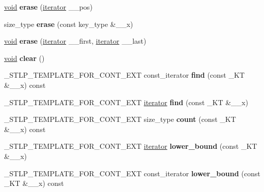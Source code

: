 \begin{DoxyCompactItemize}
\hyperlink{interfacevoid}{void} {\bfseries erase} (\hyperlink{structiterator}{iterator} \+\_\+\+\_\+pos)
\item 
\mbox{\label{classset_af22549a1c71d4ff2799a80de1c2550c2}} 
size\+\_\+type {\bfseries erase} (const key\+\_\+type \&\+\_\+\+\_\+x)
\item 
\mbox{\label{classset_a0eb060827564738597193ab7409b8a5d}} 
\hyperlink{interfacevoid}{void} {\bfseries erase} (\hyperlink{structiterator}{iterator} \+\_\+\+\_\+first, \hyperlink{structiterator}{iterator} \+\_\+\+\_\+last)
\item 
\mbox{\label{classset_aac453bed9a1533ae8b61b742715cd9b6}} 
\hyperlink{interfacevoid}{void} {\bfseries clear} ()
\item 
\mbox{\label{classset_af0da5cfd76294579571b69f02d34a4c8}} 
\+\_\+\+S\+T\+L\+P\+\_\+\+T\+E\+M\+P\+L\+A\+T\+E\+\_\+\+F\+O\+R\+\_\+\+C\+O\+N\+T\+\_\+\+E\+XT const\+\_\+iterator {\bfseries find} (const \+\_\+\+KT \&\+\_\+\+\_\+x) const
\item 
\mbox{\label{classset_ad3a014a4f6c8e4e1a434a4154601ef38}} 
\+\_\+\+S\+T\+L\+P\+\_\+\+T\+E\+M\+P\+L\+A\+T\+E\+\_\+\+F\+O\+R\+\_\+\+C\+O\+N\+T\+\_\+\+E\+XT \hyperlink{structiterator}{iterator} {\bfseries find} (const \+\_\+\+KT \&\+\_\+\+\_\+x)
\item 
\mbox{\label{classset_ad9e90e165a8c79914bada7b0bdd7d2d1}} 
\+\_\+\+S\+T\+L\+P\+\_\+\+T\+E\+M\+P\+L\+A\+T\+E\+\_\+\+F\+O\+R\+\_\+\+C\+O\+N\+T\+\_\+\+E\+XT size\+\_\+type {\bfseries count} (const \+\_\+\+KT \&\+\_\+\+\_\+x) const
\item 
\mbox{\label{classset_ad76fd2219200a0fecd43ffdd736cec47}} 
\+\_\+\+S\+T\+L\+P\+\_\+\+T\+E\+M\+P\+L\+A\+T\+E\+\_\+\+F\+O\+R\+\_\+\+C\+O\+N\+T\+\_\+\+E\+XT \hyperlink{structiterator}{iterator} {\bfseries lower\+\_\+bound} (const \+\_\+\+KT \&\+\_\+\+\_\+x)
\item 
\mbox{\label{classset_a1f6298cd08684595eca1f8f717c73e24}} 
\+\_\+\+S\+T\+L\+P\+\_\+\+T\+E\+M\+P\+L\+A\+T\+E\+\_\+\+F\+O\+R\+\_\+\+C\+O\+N\+T\+\_\+\+E\+XT const\+\_\+iterator {\bfseries lower\+\_\+bound} (const \+\_\+\+KT \&\+\_\+\+\_\+x) const
\item 

\end{DoxyCompactItemize}
